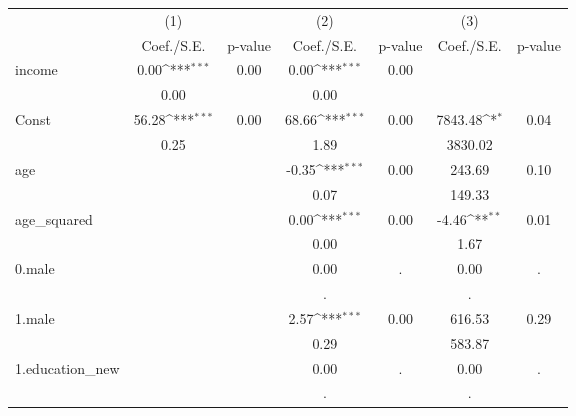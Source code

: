 {
\def\sym#1{\ifmmode^{#1}\else\(^{#1}\)\fi}
\begin{tabular}{l*{3}{cc}}
\hline\hline
            &\multicolumn{1}{c}{(1)}         &            &\multicolumn{1}{c}{(2)}         &            &\multicolumn{1}{c}{(3)}         &            \\
            &  Coef./S.E.         &     p-value&  Coef./S.E.         &     p-value&  Coef./S.E.         &     p-value\\
\hline
income      &        0.00\sym{***}&        0.00&        0.00\sym{***}&        0.00&                     &            \\
            &        0.00         &            &        0.00         &            &                     &            \\
Const       &       56.28\sym{***}&        0.00&       68.66\sym{***}&        0.00&     7843.48\sym{*}  &        0.04\\
            &        0.25         &            &        1.89         &            &     3830.02         &            \\
age         &                     &            &       -0.35\sym{***}&        0.00&      243.69         &        0.10\\
            &                     &            &        0.07         &            &      149.33         &            \\
age\_squared &                     &            &        0.00\sym{***}&        0.00&       -4.46\sym{**} &        0.01\\
            &                     &            &        0.00         &            &        1.67         &            \\
0.male      &                     &            &        0.00         &           .&        0.00         &           .\\
            &                     &            &           .         &            &           .         &            \\
1.male      &                     &            &        2.57\sym{***}&        0.00&      616.53         &        0.29\\
            &                     &            &        0.29         &            &      583.87         &            \\
1.education\_new&                     &            &        0.00         &           .&        0.00         &           .\\
            &                     &            &           .         &            &           .         &            \\

\end{tabular}}
